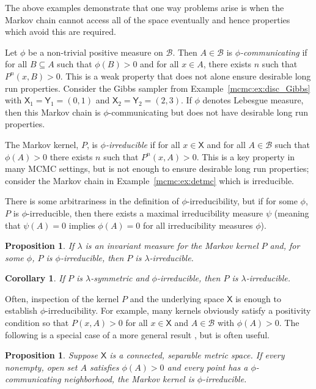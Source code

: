 \documentclass[12pt]{article}
\theoremstyle{plain}
\newtheorem{prop}[thm]{Proposition}
\newtheorem{cor}{Corollary}[section]
\theoremstyle{definition}
\theoremstyle{remark}
\newcommand{\X}{\mathsf{X}}
\newcommand{\Y}{\mathsf{Y}}
\newcommand{\B}{\mathcal{B}}
\begin{document}
The above examples demonstrate that one way problems arise is when the
Markov chain cannot access all of the space eventually and hence
properties which avoid this are required.

Let $\phi$ be a non-trivial positive measure on $\B$.  Then $A \in
\B$ is {\em $\phi$-communicating} if for all $B \subseteq A$ such that
$\phi(B) > 0$ and for all $x \in A$, there exists $n$ such that
$P^n(x,B) >0$. This is a weak property that does not alone ensure desirable long run
properties.  Consider the Gibbs sampler from
Example~\ref{mcmc:ex:disc_Gibbs} with $\X_1 = \Y_1 = (0,1)$ and
$\X_2 = \Y_2 = (2,3)$. If $\phi$ denotes Lebesgue measure, then this
Markov chain is $\phi$-communicating but does not have desirable long
run properties.

The Markov kernel, $P$,  is {\em $\phi$-irreducible} if for all $x \in \X$ and
for all $A \in \B$ such that $\phi(A) > 0$ there exists $n$ such that
$P^n (x, A) > 0$.  This is a key property in many MCMC settings, but
is not enough to ensure desirable long run properties; consider the
Markov chain in Example~\ref{mcmc:ex:detmc} which is irreducible.

There is some arbitrariness in the definition of
$\phi$-irreducibility, but if for some $\phi$, $P$ is
$\phi$-irreducible, then there exists a maximal irreducibility
measure $\psi$ (meaning that $\psi(A) = 0$ implies $\phi(A)=0$ for all
irreducibility measures $\phi$).

\begin{prop}
  \label{mcmc:prop:inv_irreducible}
  If $\lambda$ is an invariant measure for the Markov kernel $P$ and,
  for some $\phi$, $P$ is $\phi$-irreducible, then $P$ is
  $\lambda$-irreducible. 
\end{prop}

\begin{cor}
  If $P$ is $\lambda$-symmetric and $\phi$-irreducible, then $P$ is
  $\lambda$-irreducible.  
 \end{cor}

Often, inspection of the kernel $P$ and the underlying space $\X$
is enough to establish $\phi$-irreducibility.  For example, many kernels
obviously satisfy a positivity condition so that $P(x, A) > 0$ for
all $x \in \X$ and $A \in \B$ with $\phi(A) > 0$. The following is a
special case of a more general result \cite[][Theorem 3]{geye:2014},
but is often useful.

\begin{prop}
  \label{mcmc:prop:irred}
Suppose $\X$ is a connected, separable metric space.  If every
nonempty, open set $A$ satisfies $\phi(A)>0$ and every point has a
$\phi$-communicating neighborhood, the Markov kernel is
$\phi$-irreducible.  
\end{prop}
\end{document}
